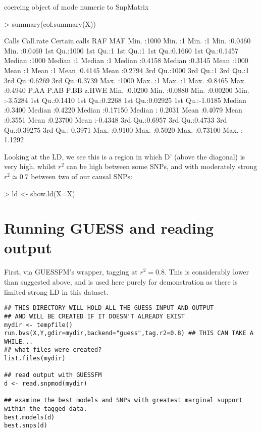 \documentclass[11pt]{article}
\begin{document}
\begin{Schunk}
\begin{Soutput}
coercing object of mode  numeric  to SnpMatrix
\end{Soutput}
\begin{Sinput}
> summary(col.summary(X))
\end{Sinput}
\begin{Soutput}
     Calls        Call.rate Certain.calls      RAF              MAF        
 Min.   :1000   Min.   :1   Min.   :1     Min.   :0.0460   Min.   :0.0460  
 1st Qu.:1000   1st Qu.:1   1st Qu.:1     1st Qu.:0.1660   1st Qu.:0.1457  
 Median :1000   Median :1   Median :1     Median :0.4158   Median :0.3145  
 Mean   :1000   Mean   :1   Mean   :1     Mean   :0.4145   Mean   :0.2794  
 3rd Qu.:1000   3rd Qu.:1   3rd Qu.:1     3rd Qu.:0.6269   3rd Qu.:0.3739  
 Max.   :1000   Max.   :1   Max.   :1     Max.   :0.8465   Max.   :0.4940  
      P.AA             P.AB             P.BB             z.HWE        
 Min.   :0.0200   Min.   :0.0880   Min.   :0.00200   Min.   :-3.5284  
 1st Qu.:0.1410   1st Qu.:0.2268   1st Qu.:0.02925   1st Qu.:-1.0185  
 Median :0.3400   Median :0.4220   Median :0.17150   Median : 0.2031  
 Mean   :0.4079   Mean   :0.3551   Mean   :0.23700   Mean   :-0.4348  
 3rd Qu.:0.6957   3rd Qu.:0.4733   3rd Qu.:0.39275   3rd Qu.: 0.3971  
 Max.   :0.9100   Max.   :0.5020   Max.   :0.73100   Max.   : 1.1292  
\end{Soutput}
\end{Schunk}

Looking at the LD, we see this is a region in which D' (above the
diagonal) is very high, whilst $r^2$ can be high between some SNPs,
and with moderately strong $r^2 \simeq 0.7$ between two of our causal
SNPs:
\begin{Schunk}
\begin{Sinput}
> ld <- show.ld(X=X)
\end{Sinput}
\end{Schunk}


\section{Running GUESS and reading output}
\label{sec-4}

First, via GUESSFM's wrapper, tagging at $r^2=0.8$.  This is
considerably lower than suggested above, and is used here purely for
demonstration as there is limited strong LD in this dataset.

\begin{verbatim}
## THIS DIRECTORY WILL HOLD ALL THE GUESS INPUT AND OUTPUT 
## AND WILL BE CREATED IF IT DOESN'T ALREADY EXIST
mydir <- tempfile() 
run.bvs(X,Y,gdir=mydir,backend="guess",tag.r2=0.8) ## THIS CAN TAKE A WHILE...
## what files were created?
list.files(mydir)

## read output with GUESSFM
d <- read.snpmod(mydir)

## examine the best models and SNPs with greatest marginal support within the tagged data.
best.models(d)
best.snps(d)
\end{verbatim}
\end{document}

